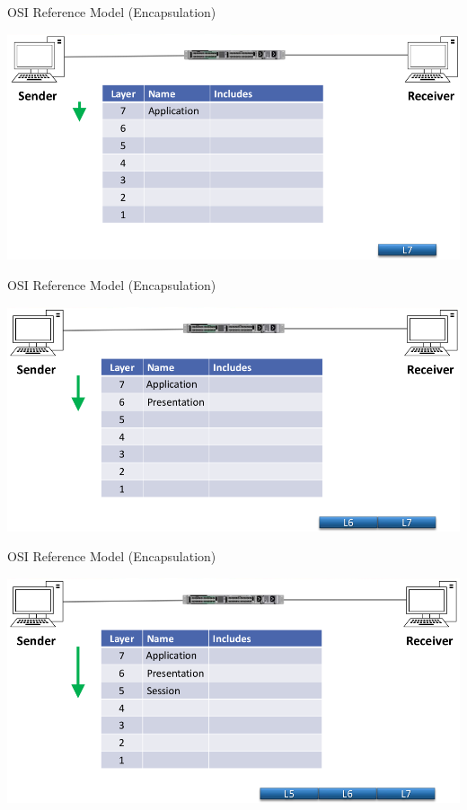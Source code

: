 \documentclass[pdflatex,compress,mathserif]{beamer}
\begin{document}
\begin{frame}{OSI Reference Model (Encapsulation)}
	\begin{center}
		\includegraphics[width=\linewidth]{img/img66}
	\end{center}
\end{frame}

\begin{frame}{OSI Reference Model (Encapsulation)}
	\begin{center}
		\includegraphics[width=\linewidth]{img/img67}
	\end{center}
\end{frame}

\begin{frame}{OSI Reference Model (Encapsulation)}
	\begin{center}
		\includegraphics[width=\linewidth]{img/img68}
	\end{center}
\end{frame}
\end{document}
